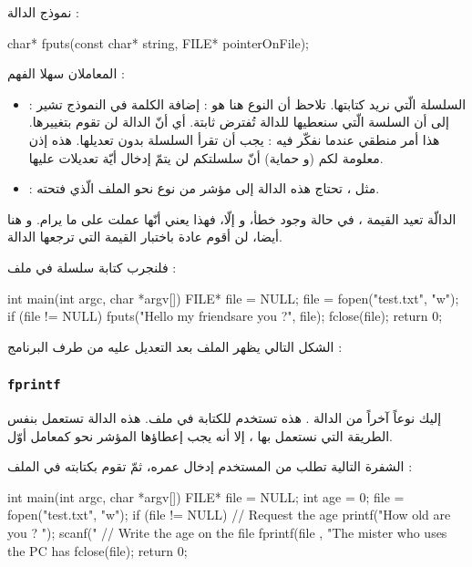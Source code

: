 نموذج الدالة :

\begin{Csource}
char* fputs(const char* string, FILE* pointerOnFile);
\end{Csource}

المعاملان سهلا الفهم :
\begin{itemize}
  \item {} :
السلسلة الّتي نريد كتابتها. تلاحظ أن النوع هنا هو
 :
إضافة الكلمة
في النموذج تشير إلى أن السلسة الّتي سنعطيها للدالة تُفترض ثابتة. أي أنّ الدالة لن تقوم بتغييرها. هذا أمر منطقي عندما نفكّر فيه :
يجب أن تقرأ السلسلة بدون تعديلها. هذه إذن معلومة لكم (و حماية) أنّ سلسلتكم لن يتمّ إدخال أيّة تعديلات عليها.
  \item {} :
 مثل
،
 تحتاج هذه الدالة إلى مؤشر من نوع
نحو الملف الّذي فتحته.
\end{itemize}

الدالّة تعيد القيمة
،
في حالة وجود خطأ، و إلّا، فهذا يعني أنّها عملت على ما يرام. و هنا أيضا، لن أقوم عادة باختبار القيمة التي ترجعها الدالة.

فلنجرب كتابة سلسلة في ملف :

\begin{Csource}
int main(int argc, char *argv[])
{
	FILE* file = NULL;
	file = fopen("test.txt", "w");
	if (file != NULL)
	{
    	 	fputs("Hello my friends\nHow are you ?", file);
    	 	fclose(file);
	}
	return 0;
}
\end{Csource}

الشكل التالي يظهر الملف بعد التعديل عليه من طرف البرنامج :


\subsubsection{\texttt{fprintf}}
إليك نوعاً آخراً من الدالة
.
هذه تستخدم للكتابة في ملف. هذه الدالة تستعمل بنفس الطريقة التي نستعمل بها
،
إلا أنه يجب إعطاؤها المؤشر نحو
كمعامل أوّل.

الشفرة التالية تطلب من المستخدم إدخال عمره، ثمّ تقوم بكتابته في الملف :

\begin{Csource}
int main(int argc, char *argv[])
{
	FILE* file = NULL;
	int age = 0;
	file = fopen("test.txt", "w");
	if (file != NULL)
	{
    		// Request the age
    		printf("How old are you ? ");
    		scanf("%
    		// Write the age on the file
    		fprintf(file , "The mister who uses the PC has %
    		fclose(file);
	}
 	return 0;
 }
\end{Csource}

